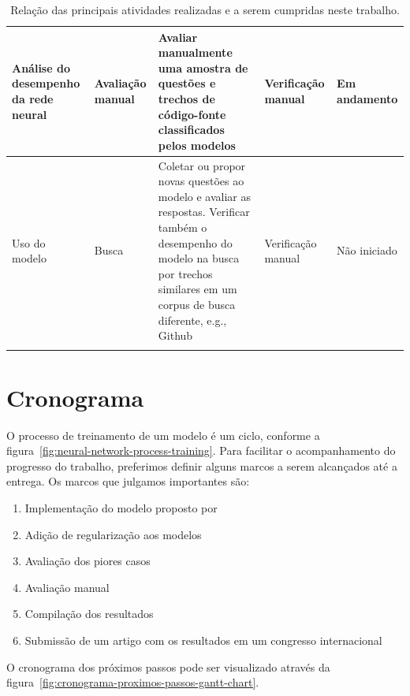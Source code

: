 {\begin{longtable}{ p{8em} p{8em} p{10em} p{8em} p{6em} }
Análise do desempenho da rede neural & Avaliação manual & Avaliar manualmente uma amostra de questões e trechos de código-fonte classificados pelos modelos & Verificação manual & Em andamento \\
\hline

Uso do modelo & Busca & Coletar ou propor novas questões ao modelo e avaliar as respostas. Verificar também o desempenho do modelo na busca por trechos similares em um corpus de busca diferente, e.g., Github & Verificação manual & Não iniciado \\
\hline

 
\caption{Relação das principais atividades realizadas e a serem cumpridas neste trabalho.}
\label{table:etapas-processo-treinamento}
\end{longtable}}


\section{Cronograma}

O processo de treinamento de um modelo é um ciclo, conforme a figura~\ref{fig:neural-network-process-training}. Para facilitar o acompanhamento do progresso do trabalho, preferimos definir alguns marcos a serem alcançados até a entrega. Os marcos que julgamos importantes são:

\begin{enumerate}
\item Implementação do modelo proposto por \cite{cambronero-deep-learning-code-search:2019}

\item Adição de regularização aos modelos

\item Avaliação dos piores casos

\item Avaliação manual

\item Compilação dos resultados

\item Submissão de um artigo com os resultados em um congresso internacional

\end{enumerate}

O cronograma dos próximos passos pode ser visualizado através da figura~\ref{fig:cronograma-proximos-passos-gantt-chart}.

